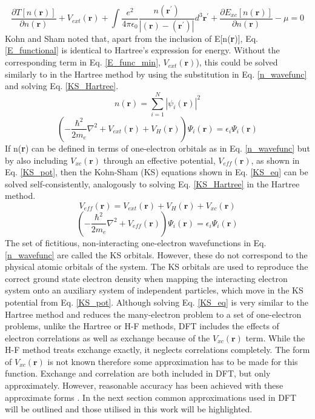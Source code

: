 \documentclass[11pt, twoside]{report}
\begin{document}
\begin{equation}\label{E_func_min}
\frac{\partial T[n(\mathbf{r})]}{\partial n(\mathbf{r})} + V_{ext}(\mathbf{r}) + \int \frac{e^2}{4\pi \epsilon_0}\frac{n(\mathbf{r^{\prime}})}{|(\mathbf{r})-(\mathbf{r^{\prime}})|}d^3\mathbf{r^{\prime}} + \frac{\partial E_{xc}[n(\mathbf{r})]}{\partial n(\mathbf{r})} - \mu = 0
\end{equation}
Kohn and Sham noted that, apart from the inclusion of E[n(\textbf{r})], Eq. \ref{E_functional} is identical to Hartree's expression for energy. Without the corresponding term in Eq. \ref{E_func_min}, $V_{ext}(\mathbf{r})$), this could be solved similarly to in the Hartree method by using the substitution in Eq. \ref{n_wavefunc} and solving Eq. \ref{KS_Hartree}.
\begin{equation}\label{n_wavefunc}
n(\mathbf{r}) = \sum^N_{i=1} |\psi_i(\mathbf{r})|^2
\end{equation}
\begin{equation}\label{KS_Hartree}
\left( -\frac{\hbar^2}{2m_e}\nabla^2 + V_{ext}(\mathbf{r}) + V_H(\mathbf{r}) \right) \Psi_i(\mathbf{r}) = \epsilon_i \Psi_i(\mathbf{r})  
\end{equation}
If n(\textbf{r}) can be defined in terms of one-electron orbitals as in Eq. \ref{n_wavefunc} but by also including $V_{xc}(\mathbf{r})$ through an effective potential, $V_{eff}(\mathbf{r})$, as shown in Eq. \ref{KS_pot}, then the Kohn-Sham (KS) equations shown in Eq. \ref{KS_eq} can be solved self-consistently, analogously to solving Eq. \ref{KS_Hartree} in the Hartree method.
\begin{equation}\label{KS_pot}
V_{eff}(\mathbf{r}) = V_{ext}(\mathbf{r}) + V_H(\mathbf{r}) + V_{xc}(\mathbf{r})
\end{equation}
\begin{equation}\label{KS_eq}
\left( -\frac{\hbar^2}{2m_e}\nabla^2 + V_{eff}(\mathbf{r}) \right) \Psi_i(\mathbf{r}) = \epsilon_i \Psi_i(\mathbf{r})
\end{equation}
The set of fictitious, non-interacting one-electron wavefunctions in Eq. \ref{n_wavefunc} are called the KS orbitals. However, these do not correspond to the physical atomic orbitals of the system. The KS orbitals are used to reproduce the correct ground state electron density when mapping the interacting electron system onto an auxiliary system of independent particles, which move in the KS potential from Eq. \ref{KS_pot}. Although solving Eq. \ref{KS_eq} is very similar to the Hartree method and reduces the many-electron problem to a set of one-electron problems, unlike the Hartree or H-F methods, DFT includes the effects of electron correlations as well as exchange because of the $V_{xc}(\mathbf{r})$ term. While the H-F method treats exchange exactly, it neglects correlations completely. The form of $V_{xc}(\mathbf{r})$ is not known therefore some approximation has to be made for this function. Exchange and correlation are both included in DFT, but only approximately. However, reasonable accuracy has been achieved with these approximate forms \cite{Prasad_ch3}. In the next section common approximations used in DFT will be outlined and those utilised in this work will be highlighted.
\end{document}
